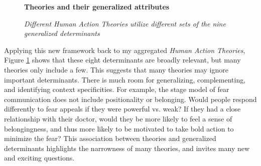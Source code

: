 \documentclass[12 pt]{article}
\begin{document}
 \begin{figure}
 	\centering
 	\textbf{Theories and their generalized attributes}\par \medskip

 	\caption{\textit{Different Human Action Theories utilize different sets of the nine generalized determinants}}
 	 	\label{fig:unifact}
 \end{figure}
 
  Applying this new framework back to my aggregated \textit{Human Action Theories}, Figure \ref{fig:unifact} shows that these eight determinants are broadly relevant, but many theories only include a few. This suggests that many theories may ignore important determinants. There is much room for generalizing, complementing, and identifying context specificities. For example, the stage model of fear communication does not include positionality or belonging. Would people respond differently to fear appeals if they were powerful vs. weak? If they had a close relationship with their doctor, would they be more likely to feel a sense of belongingness, and thus more likely to be motivated to take bold action to minimize the fear? This association between theories and generalized determinants highlights the narrowness of many theories, and invites many new and exciting questions.  
 
\end{document}
